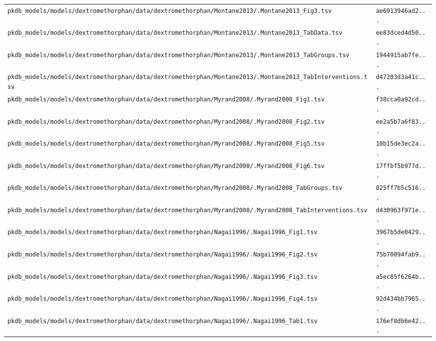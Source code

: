 \begin{longtable}{ll}
\texttt{pkdb\_models/models/dextromethorphan/data/dextromethorphan/Montane2013/.Montane2013\_Fig3.tsv} & \texttt{ae6913946ad2...} \\
\texttt{pkdb\_models/models/dextromethorphan/data/dextromethorphan/Montane2013/.Montane2013\_TabData.tsv} & \texttt{ee83dced4d50...} \\
\texttt{pkdb\_models/models/dextromethorphan/data/dextromethorphan/Montane2013/.Montane2013\_TabGroups.tsv} & \texttt{1944915ab7fe...} \\
\texttt{pkdb\_models/models/dextromethorphan/data/dextromethorphan/Montane2013/.Montane2013\_TabInterventions.tsv} & \texttt{d47203d3a41c...} \\
\texttt{pkdb\_models/models/dextromethorphan/data/dextromethorphan/Myrand2008/.Myrand2008\_Fig1.tsv} & \texttt{f38cca0a92cd...} \\
\texttt{pkdb\_models/models/dextromethorphan/data/dextromethorphan/Myrand2008/.Myrand2008\_Fig2.tsv} & \texttt{ee2a5b7a6f83...} \\
\texttt{pkdb\_models/models/dextromethorphan/data/dextromethorphan/Myrand2008/.Myrand2008\_Fig5.tsv} & \texttt{10b15de3ec2a...} \\
\texttt{pkdb\_models/models/dextromethorphan/data/dextromethorphan/Myrand2008/.Myrand2008\_Fig6.tsv} & \texttt{17ffbf5b977d...} \\
\texttt{pkdb\_models/models/dextromethorphan/data/dextromethorphan/Myrand2008/.Myrand2008\_TabGroups.tsv} & \texttt{825ff7b5c516...} \\
\texttt{pkdb\_models/models/dextromethorphan/data/dextromethorphan/Myrand2008/.Myrand2008\_TabInterventions.tsv} & \texttt{d430963f971e...} \\
\texttt{pkdb\_models/models/dextromethorphan/data/dextromethorphan/Nagai1996/.Nagai1996\_Fig1.tsv} & \texttt{3967b5de0429...} \\
\texttt{pkdb\_models/models/dextromethorphan/data/dextromethorphan/Nagai1996/.Nagai1996\_Fig2.tsv} & \texttt{75b70094fab9...} \\
\texttt{pkdb\_models/models/dextromethorphan/data/dextromethorphan/Nagai1996/.Nagai1996\_Fig3.tsv} & \texttt{a5ec85f6264b...} \\
\texttt{pkdb\_models/models/dextromethorphan/data/dextromethorphan/Nagai1996/.Nagai1996\_Fig4.tsv} & \texttt{92d434bb7965...} \\
\texttt{pkdb\_models/models/dextromethorphan/data/dextromethorphan/Nagai1996/.Nagai1996\_Tab1.tsv} & \texttt{176ef8db6e42...} \\

\end{longtable}
